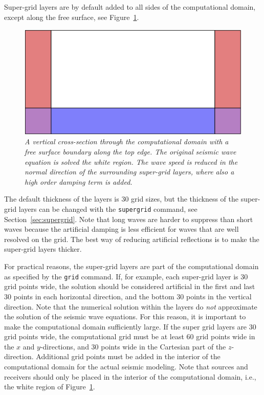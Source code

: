 \documentclass[11pt]{report}
\begin{document}
Super-grid layers are by default added to all sides of the computational domain, except along the
free surface, see Figure~\ref{fig:layout}.
\begin{figure}[th]
\begin{center}
\includegraphics[width=0.65\linewidth]{layout.png}
\caption{\em A vertical cross-section through the computational domain with a free surface boundary
  along the top edge. The original seismic wave equation is solved the white region. The wave speed
  is reduced in the normal direction of the surrounding super-grid layers, where also a high order
  damping term is added.}\label{fig:layout}
\end{center}
\end{figure}
The default thickness of the layers is 30 grid sizes, but the thickness of the super-grid layers can
be changed with the {\tt supergrid} command, see Section~\ref{sec:supergrid}. Note that long waves
are harder to suppress than short waves because the artificial damping is less efficient for waves
that are well resolved on the grid. The best way of reducing artificial reflections is to make the
super-grid layers thicker.

For practical reasons, the super-grid layers are part of the computational domain as specified by
the {\tt grid} command. If, for example, each super-grid layer is 30 grid points wide, the solution
should be considered artificial in the first and last 30 points in each horizontal direction, and
the bottom 30 points in the vertical direction. Note that the numerical solution within the layers
do {\em not} approximate the solution of the seismic wave equations. For this reason, it is
important to make the computational domain sufficiently large. If the super grid layers are 30 grid
points wide, the computational grid must be at least 60 grid points wide in the $x$ and
$y$-directions, and 30 points wide in the Cartesian part of the $z$-direction. Additional grid
points must be added in the interior of the computational domain for the actual seismic
modeling. Note that sources and receivers should only be placed in the interior of the computational
domain, i.e., the white region of Figure~\ref{fig:layout}.
\end{document}
